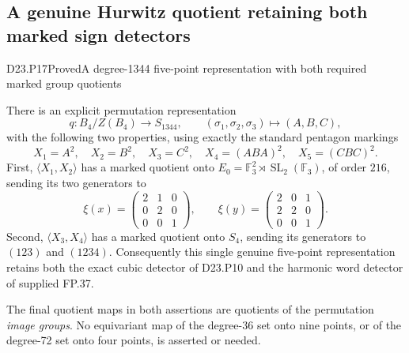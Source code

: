\subsection{A genuine Hurwitz quotient retaining both marked sign detectors}

\begin{statement}{D23.P17}{Proved}{A degree-1344 five-point representation with both required marked group quotients}
\end{statement}
There is an explicit permutation representation
\[
 q:B_4/Z(B_4)\longrightarrow S_{1344},\qquad
 (\sigma_1,\sigma_2,\sigma_3)\longmapsto(A,B,C),
\]
with the following two properties, using exactly the standard
pentagon markings
\[
 X_1=A^2,\quad X_2=B^2,\quad X_3=C^2,\quad
 X_4=(ABA)^2,\quad X_5=(CBC)^2.
 \tag{D23.P17.1}
\]
First, $\langle X_1,X_2\rangle$ has a marked quotient onto
$E_0=\mathbb F_3^2\rtimes\operatorname{SL}_2(\mathbb F_3)$,
of order $216$, sending its two generators to
\[
 \xi(x)=\begin{pmatrix}2&1&0\\0&2&0\\0&0&1\end{pmatrix},
 \qquad
 \xi(y)=\begin{pmatrix}2&0&1\\2&2&0\\0&0&1\end{pmatrix}.
 \tag{D23.P17.2}
\]
Second, $\langle X_3,X_4\rangle$ has a marked quotient onto
$S_4$, sending its generators to $(123)$ and $(1234)$.
Consequently this single genuine five-point representation
retains both the exact cubic detector of D23.P10 and the
harmonic word detector of supplied FP.37.

The final quotient maps in both assertions are quotients of
the permutation \emph{image groups}. No equivariant map of
the degree-36 set onto nine points, or of the degree-72 set
onto four points, is asserted or needed.

